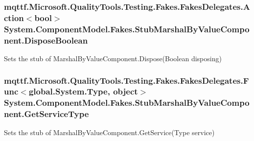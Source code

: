 \hypertarget{class_system_1_1_component_model_1_1_fakes_1_1_stub_marshal_by_value_component_aff6bdffb807eb2cd4d87f693fe9e18a8}{
\subsubsection[{Dispose\-Boolean}]{\setlength{\rightskip}{0pt plus 5cm}mqttf.\-Microsoft.\-Quality\-Tools.\-Testing.\-Fakes.\-Fakes\-Delegates.\-Action$<$bool$>$ System.\-Component\-Model.\-Fakes.\-Stub\-Marshal\-By\-Value\-Component.\-Dispose\-Boolean}}\label{class_system_1_1_component_model_1_1_fakes_1_1_stub_marshal_by_value_component_aff6bdffb807eb2cd4d87f693fe9e18a8}


Sets the stub of Marshal\-By\-Value\-Component.\-Dispose(\-Boolean disposing)

\hypertarget{class_system_1_1_component_model_1_1_fakes_1_1_stub_marshal_by_value_component_af412621ccd3f383e82648acb564ae17f}{
\subsubsection[{Get\-Service\-Type}]{\setlength{\rightskip}{0pt plus 5cm}mqttf.\-Microsoft.\-Quality\-Tools.\-Testing.\-Fakes.\-Fakes\-Delegates.\-Func$<$global.\-System.\-Type, object$>$ System.\-Component\-Model.\-Fakes.\-Stub\-Marshal\-By\-Value\-Component.\-Get\-Service\-Type}}\label{class_system_1_1_component_model_1_1_fakes_1_1_stub_marshal_by_value_component_af412621ccd3f383e82648acb564ae17f}


Sets the stub of Marshal\-By\-Value\-Component.\-Get\-Service(\-Type service)

